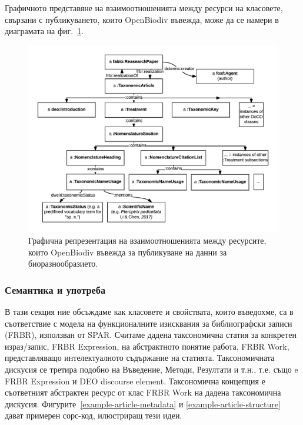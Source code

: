 Графичното представяне на взаимоотношенията между ресурси на класовете, свързани с публикуването, които OpenBiodiv въвежда, може да се намери в диаграмата на фиг.~\ref{taxonomic-article-diagram}.

\begin{figure}[h!]
	\centering
	\includegraphics[width=\textwidth]{Figures/taxonomic-article-diagram}
	\decoRule
  \caption[Taxonomic article diagram.]{Графична репрезентация на взаимоотношенията между ресурсите, които OpenBiodiv въвежда за публикуване на данни за биоразнообразието.}
  \label{taxonomic-article-diagram}
\end{figure}

\subsubsection{Семантика и употреба}

В тази секция ние обсъждаме как класовете и свойствата, които въведохме, са в съответствие с модела на функционалните изисквания за библиографски записи (FRBR), използван от SPAR. Считаме дадена таксономична статия за конкретен израз/запис, FRBR Expression, на абстрактното понятие работа, FRBR Work, представляващо интелектуалното съдържание на статията. Таксономичната дискусия се третира подобно на Въведение, Методи, Резултати и т.н., т.е. също e FRBR Expression и DEO discourse element. Таксономична концепция е съответният абстрактен ресурс от клас FRBR Work на дадена таксономична дискусия. Фигурите~\ref{example-article-metadata} и \ref{example-article-structure} дават примерен сорс-код, илюстриращ тези идеи.

